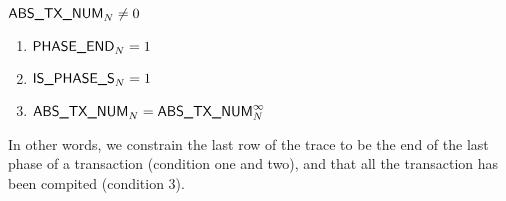 \If $\textsf{ABS\_TX\_NUM}_{N} \ne 0$ \Then
\begin{enumerate}
    \item $\textsf{PHASE\_END}_{N} = 1$
    \item $\textsf{IS\_PHASE\_S}_{N} = 1$
    \item $\textsf{ABS\_TX\_NUM}_{N} = \textsf{ABS\_TX\_NUM}_{N}^{\infty}$
\end{enumerate}
In other words, we constrain the last row of the trace to be the end of the last phase of a transaction (condition one and two), and that all the transaction has been compited (condition 3).
